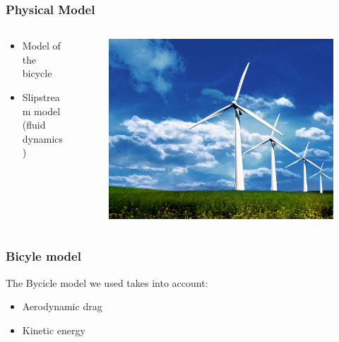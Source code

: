 \documentclass{beamer}
\begin{document}
\begin{frame}
\frametitle{Physical Model}

\begin{columns}
  \begin{column}{0.6\textwidth}
    \begin{itemize}
    \item Model of the bicycle
      \vspace{0.2cm}
    \item Slipstream model (fluid dynamics)
    \end{itemize}
  \end{column}
  
  \begin{column}{0.4\textwidth}
    \begin{figure}[ht!]
      \includegraphics[scale=0.1]{physical.jpg}
    \end{figure} 
  \end{column}
\end{columns}

\end{frame}

\begin{frame}
\frametitle{Bicyle model}
The Bycicle model we used takes into account:
\begin{itemize}
\vspace{0.7cm}
\pause
\item Aerodynamic drag
\vspace{0.7cm}
\pause
\item Kinetic energy
\end{itemize}
\pause
\vspace{0.7cm}

\end{frame}
\end{document}
